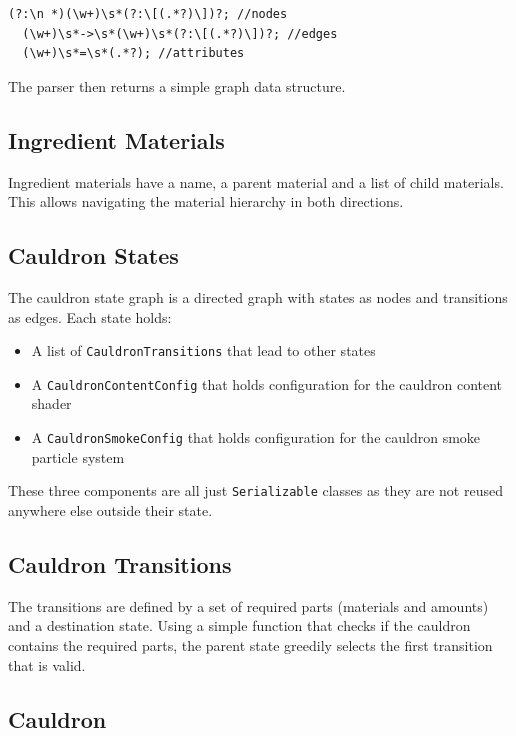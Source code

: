 \documentclass{vgtc}
\begin{document}
\begin{lstlisting}[caption=Regex Patterns, label=lst:RegexPatterns]
  (?:\n *)(\w+)\s*(?:\[(.*?)\])?; //nodes
  (\w+)\s*->\s*(\w+)\s*(?:\[(.*?)\])?; //edges
  (\w+)\s*=\s*(.*?); //attributes
\end{lstlisting}

The parser then returns a simple graph data structure.

\subsection{Ingredient Materials}

Ingredient materials have a name, a parent material and a list of child materials. This allows navigating
the material hierarchy in both directions.

\subsection{Cauldron States}

The cauldron state graph is a directed graph with states as nodes and transitions as edges. Each state holds:

\begin{itemize}
  \item A list of \texttt{CauldronTransitions} that lead to other states
  \item A \texttt{CauldronContentConfig} that holds configuration for the cauldron content shader
  \item A \texttt{CauldronSmokeConfig} that holds configuration for the cauldron smoke particle system
\end{itemize}

These three components are all just \texttt{Serializable} classes as they are not reused anywhere else outside
their state.

\subsection{Cauldron Transitions}

The transitions are defined by a set of required parts (materials and amounts) and a destination state. Using a
simple function that checks if the cauldron contains the required parts, the parent state greedily selects the
first transition that is valid.

\subsection{Cauldron}
\end{document}
